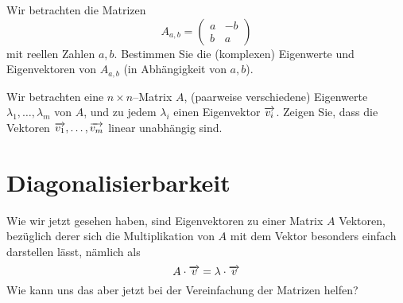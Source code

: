\begin{aufgabe}\label{linalg_ev_kompl_ew_aufg1} Wir betrachten die Matrizen
  	$$ A_{a,b} = \left( \begin{matrix} a & -b \\ b & a \end{matrix} \right) $$
mit reellen Zahlen $a,b$. Bestimmen Sie die (komplexen) Eigenwerte und Eigenvektoren 
von $A_{a,b}$ (in Abhängigkeit von $a,b$).
\end{aufgabe}


\begin{aufgabe}\label{ew_lin_un} Wir betrachten eine $n \times n$--Matrix $A$, 
(paarweise verschiedene) Eigenwerte $\lambda_1, \ldots, \lambda_m$ von $A$, und zu 
jedem $\lambda_i$ einen Eigenvektor $\overrightarrow{v_i}$. Zeigen Sie, dass die 
Vektoren $\overrightarrow{v_1}, \ldots, \overrightarrow{v_m}$ linear unabhängig 
sind.
\end{aufgabe}

\bigbreak 

\newpage

\section{Diagonalisierbarkeit}\label{section_diag}

\setcounter{definition}{0}
\setcounter{beispiel}{0}
\setcounter{notiz}{0}

Wie wir jetzt gesehen haben, sind Eigenvektoren zu einer Matrix $A$ Vektoren, 
bezüglich derer sich die Multiplikation von $A$ mit dem Vektor besonders einfach 
darstellen lässt, nämlich als
  	$$ A \cdot \overrightarrow{v} = \lambda \cdot \overrightarrow{v} $$
Wie kann uns das aber jetzt bei der Vereinfachung der Matrizen helfen?

